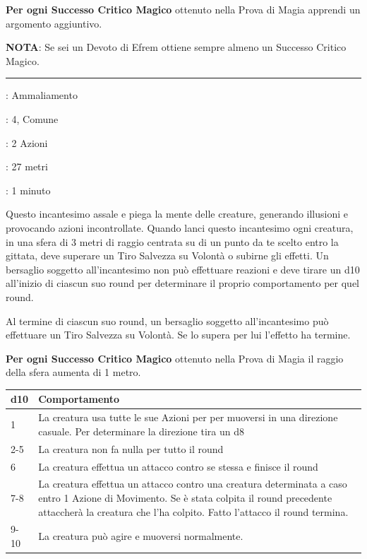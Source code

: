 \begin{multicols}{2}
\textbf{Per ogni Successo Critico Magico} ottenuto nella Prova di Magia apprendi un argomento aggiuntivo.

\textbf{NOTA}: Se sei un Devoto di Efrem ottiene sempre almeno un Successo Critico Magico.

\smallskip\noindent\rule{\linewidth}{2pt} \hypertarget{Confusione}{}\smallskip{}\hypertarget{incconfusione}{}\label{incconfusione}
\noindent
\begin{description}[noitemsep, topsep=0pt, parsep=0pt, partopsep=0pt, leftmargin=0cm, labelwidth=1.3cm]
	\item[\textbf{Lista}]: Ammaliamento
	\item[\textbf{Livello}]: 4, Comune
	\item[\textbf{Lancio}]: 2 Azioni
	\item[\textbf{Gittata}]: 27 metri
	\item[\textbf{Durata}]: 1 minuto
\end{description}

Questo incantesimo assale e piega la mente delle creature, generando illusioni e provocando azioni incontrollate. Quando lanci questo incantesimo ogni creatura, in una sfera di 3 metri di raggio centrata su di un punto da te scelto entro la gittata, deve superare un Tiro Salvezza su Volontà o subirne gli effetti. Un bersaglio soggetto all'incantesimo non può effettuare reazioni e deve tirare un d10 all'inizio di ciascun suo round per determinare il proprio comportamento per quel round.

Al termine di ciascun suo round, un bersaglio soggetto all'incantesimo può effettuare un Tiro Salvezza su Volontà. Se lo supera per lui l'effetto ha termine.

\textbf{Per ogni Successo Critico Magico} ottenuto nella Prova di Magia il raggio della sfera aumenta di 1 metro.

\medskip

\noindent\begin{tabularx}{0.45\textwidth}{lX}
	\toprule
	d10 & Comportamento\\
	\toprule
	1 & La creatura usa tutte le sue Azioni per per muoversi in una direzione casuale. Per determinare la direzione tira un d8\\
	2-5 & La creatura non fa nulla per tutto il round\\
	6 & La creatura effettua un attacco contro se stessa e finisce il round\\
	7-8 & La creatura effettua un attacco contro una creatura determinata a caso entro 1 Azione di Movimento. Se è stata colpita il round precedente attaccherà la creatura che l'ha colpito. Fatto l'attacco il round termina.\\
	9-10 & La creatura può agire e muoversi normalmente.
\end{tabularx}


\end{multicols}
